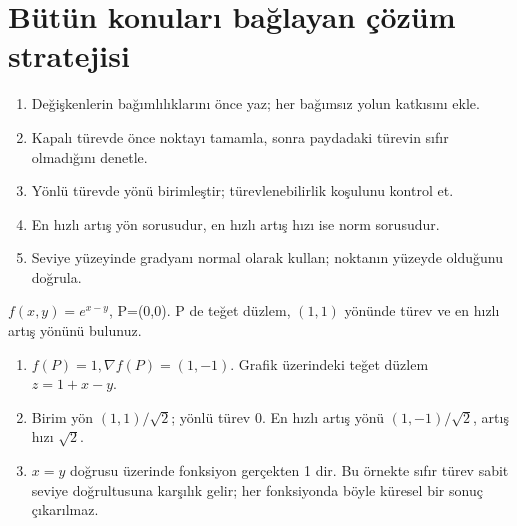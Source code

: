 \section{Bütün konuları bağlayan çözüm stratejisi}
\begin{enumerate}
\item Değişkenlerin bağımlılıklarını önce yaz; her bağımsız yolun katkısını ekle.
\item Kapalı türevde önce noktayı tamamla, sonra paydadaki türevin sıfır olmadığını denetle.
\item Yönlü türevde yönü birimleştir; türevlenebilirlik koşulunu kontrol et.
\item En hızlı artış yön sorusudur, en hızlı artış hızı ise norm sorusudur.
\item Seviye yüzeyinde gradyanı normal olarak kullan; noktanın yüzeyde olduğunu doğrula.
\end{enumerate}
\begin{tcolorbox}[title={Örnek 6.13 | Birleşik pekiştirme},colframe=accent]\(f(x,y)=e^{x-y}\), P=(0,0). P de teğet düzlem, \((1,1)\) yönünde türev ve en hızlı artış yönünü bulunuz.
\par\vspace{1mm}{\scriptsize\sffamily Pekiştirme}\end{tcolorbox}
\begin{tcolorbox}[title={Adım adım çözüm},colback=green!3!white,colframe=green]\begin{enumerate}
\item \(f(P)=1,\nabla f(P)=(1,-1)\). Grafik üzerindeki teğet düzlem \(z=1+x-y\).
\item Birim yön \((1,1)/\sqrt2\); yönlü türev 0. En hızlı artış yönü \((1,-1)/\sqrt2\), artış hızı \(\sqrt2\).
\item \(x=y\) doğrusu üzerinde fonksiyon gerçekten 1 dir. Bu örnekte sıfır türev sabit seviye doğrultusuna karşılık gelir; her fonksiyonda böyle küresel bir sonuç çıkarılmaz.
\end{enumerate}\end{tcolorbox}

\clearpage
